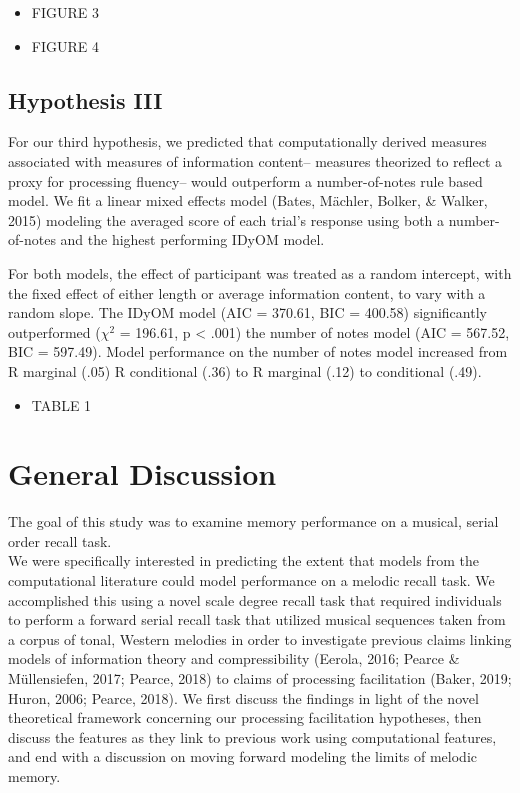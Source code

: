 \documentclass[english,man]{apa6}
\providecommand{\tightlist}{%
  \setlength{\itemsep}{0pt}\setlength{\parskip}{0pt}}
\begin{document}
\begin{itemize}
\item
  FIGURE 3
\item
  FIGURE 4
\end{itemize}

\hypertarget{hypothesis-iii}{%
\subsection{Hypothesis III}\label{hypothesis-iii}}

For our third hypothesis, we predicted that computationally derived measures associated with measures of information content-- measures theorized to reflect a proxy for processing fluency-- would outperform a number-of-notes rule based model.
We fit a linear mixed effects model (Bates, Mächler, Bolker, \& Walker, 2015) modeling the averaged score of each trial's response using both a number-of-notes and the highest performing IDyOM model.

For both models, the effect of participant was treated as a random intercept, with the fixed effect of either length or average information content, to vary with a random slope. The IDyOM model (AIC = 370.61, BIC = 400.58) significantly outperformed (\(\chi^2\) = 196.61, p \textless{} .001) the number of notes model (AIC = 567.52, BIC = 597.49). Model performance on the number of notes model increased from R marginal (.05) R conditional (.36) to R marginal (.12) to conditional (.49).

\begin{itemize}
\tightlist
\item
  TABLE 1
\end{itemize}

\hypertarget{general-discussion}{%
\section{General Discussion}\label{general-discussion}}

The goal of this study was to examine memory performance on a musical, serial order recall task.\\
We were specifically interested in predicting the extent that models from the computational literature could model performance on a melodic recall task.
We accomplished this using a novel scale degree recall task that required individuals to perform a forward serial recall task that utilized musical sequences taken from a corpus of tonal, Western melodies in order to investigate previous claims linking models of information theory and compressibility (Eerola, 2016; Pearce \& Müllensiefen, 2017; Pearce, 2018) to claims of processing facilitation (Baker, 2019; Huron, 2006; Pearce, 2018).
We first discuss the findings in light of the novel theoretical framework concerning our processing facilitation hypotheses, then discuss the features as they link to previous work using computational features, and end with a discussion on moving forward modeling the limits of melodic memory.
\end{document}
